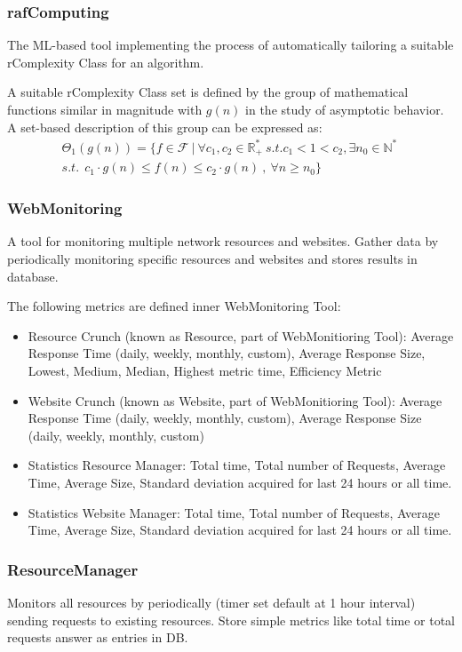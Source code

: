 \subsubsection{rafComputing}
The ML-based tool implementing the process of automatically tailoring a suitable rComplexity Class for an algorithm.


A suitable rComplexity Class set is defined by the group of mathematical functions similar in magnitude with  $g(n)$ in the study of asymptotic behavior. A set-based description of this group can be expressed as:
  \[\begin{split} \Theta_{1}(g(n)) = \lbrace f \in \mathcal{F}\ |\ \forall c_{1}, c_{2} \in \mathbb{R}^{*}_{+} \ s.t.  c_{1} < 1 < c_{2} , \exists n_{0} \in \mathbb{N}^{*}\ \\ s.t.\ \ c_{1} \cdot g(n) \leq f(n) \leq c_{2} \cdot g(n)\ ,\  \forall n \geq n_{0} \rbrace \end{split} \]


\subsubsection{WebMonitoring}
A tool for monitoring multiple network resources and websites. 
Gather data by periodically monitoring specific resources and websites and stores results in database.

The following metrics are defined inner WebMonitoring Tool:
\begin{itemize}
	\item Resource Crunch (known as Resource, part of WebMonitioring Tool): Average Response Time (daily, weekly, monthly, custom), Average Response Size, Lowest, Medium, Median, Highest metric time, Efficiency Metric	
	\item Website Crunch (known as Website, part of WebMonitioring Tool): Average Response Time (daily, weekly, monthly, custom), Average Response Size (daily, weekly, monthly, custom)
	\item Statistics Resource Manager: Total time, Total number of Requests, Average Time, Average Size, Standard deviation acquired for last 24 hours or all time.
	\item Statistics Website Manager: Total time, Total number of Requests, Average Time, Average Size, Standard deviation acquired for last 24 hours or all time.
\end{itemize}

\subsubsection{ResourceManager}
Monitors all resources by periodically (timer set default at 1 hour interval) sending requests to existing resources.
Store simple metrics like total time or total requests answer as entries in DB. 

